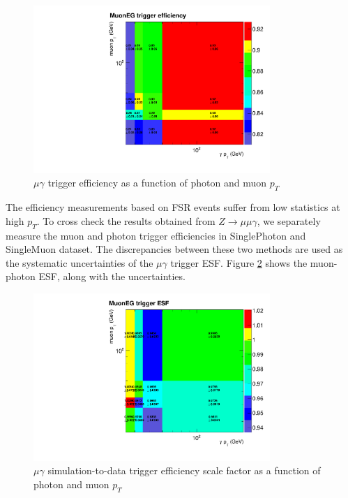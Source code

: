 \documentclass[thesis.tex]{subfiles}
\renewcommand\_{\textunderscore\allowbreak}
\begin{document}
\begin{figure}[tb]
 \centering
 \includegraphics[width=0.8\textwidth]{Figures/mgTrigger_efficiency.pdf}
  \caption{$\mu\gamma$ trigger efficiency as a function of photon and muon $p_{T}$ }
  \label{fig:mgtriggereff}
\end{figure}

The efficiency measurements based on FSR events suffer from low statistics at high $p_{T}$. To cross check the results obtained from $Z\rightarrow\mu\mu\gamma$, we separately measure the muon and photon trigger efficiencies in SinglePhoton and SingleMuon dataset. The discrepancies between these two methods are used as the systematic uncertainties of the $\mu\gamma$ trigger ESF. Figure \ref{fig:mgtriggerESF} shows the muon-photon ESF, along with the uncertainties. 


\begin{figure}[tb]
 \centering
 \includegraphics[width=0.8\textwidth]{Figures/mgTrigger_ESF.pdf}
  \caption{$\mu\gamma$ simulation-to-data trigger efficiency scale factor as a function of photon and muon $p_{T}$ }
  \label{fig:mgtriggerESF}
\end{figure}
\end{document}
